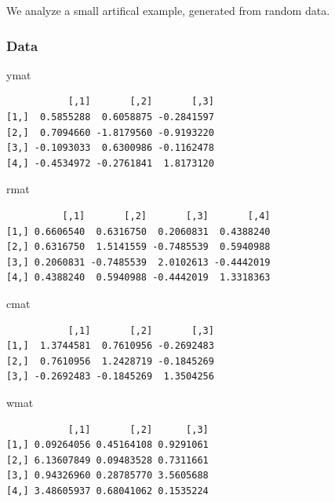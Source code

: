 \documentclass[
  12pt,
  letterpaper,
  DIV=11,
  numbers=noendperiod]{scrartcl}
\newenvironment{Shaded}{\begin{snugshade}}{\end{snugshade}}
\newcommand{\NormalTok}[1]{\textcolor[rgb]{0.00,0.23,0.31}{#1}}
\begin{document}
We analyze a small artifical example, generated from random data.

\subsubsection{Data}\label{data}

\begin{Shaded}
\begin{Highlighting}[]
\NormalTok{ymat}
\end{Highlighting}
\end{Shaded}

\begin{verbatim}
           [,1]       [,2]       [,3]
[1,]  0.5855288  0.6058875 -0.2841597
[2,]  0.7094660 -1.8179560 -0.9193220
[3,] -0.1093033  0.6300986 -0.1162478
[4,] -0.4534972 -0.2761841  1.8173120
\end{verbatim}

\begin{Shaded}
\begin{Highlighting}[]
\NormalTok{rmat}
\end{Highlighting}
\end{Shaded}

\begin{verbatim}
          [,1]       [,2]       [,3]       [,4]
[1,] 0.6606540  0.6316750  0.2060831  0.4388240
[2,] 0.6316750  1.5141559 -0.7485539  0.5940988
[3,] 0.2060831 -0.7485539  2.0102613 -0.4442019
[4,] 0.4388240  0.5940988 -0.4442019  1.3318363
\end{verbatim}

\begin{Shaded}
\begin{Highlighting}[]
\NormalTok{cmat}
\end{Highlighting}
\end{Shaded}

\begin{verbatim}
           [,1]       [,2]       [,3]
[1,]  1.3744581  0.7610956 -0.2692483
[2,]  0.7610956  1.2428719 -0.1845269
[3,] -0.2692483 -0.1845269  1.3504256
\end{verbatim}

\begin{Shaded}
\begin{Highlighting}[]
\NormalTok{wmat}
\end{Highlighting}
\end{Shaded}

\begin{verbatim}
           [,1]       [,2]      [,3]
[1,] 0.09264056 0.45164108 0.9291061
[2,] 6.13607849 0.09483528 0.7311661
[3,] 0.94326960 0.28785770 3.5605688
[4,] 3.48605937 0.68041062 0.1535224
\end{verbatim}
\end{document}

